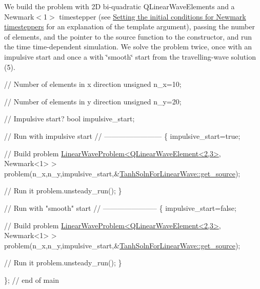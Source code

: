 We build the problem with 2D bi-\/quadratic {\ttfamily Q\+Linear\+Wave\+Elements} and a {\ttfamily Newmark$<$1$>$} timestepper (see \hyperlink{index_IC}{Setting the initial conditions for Newmark timesteppers} for an explanation of the template argument), passing the number of elements, and the pointer to the source function to the constructor, and run the time time-\/dependent simulation. We solve the problem twice, once with an impulsive start and once a with \char`\"{}smooth\char`\"{} start from the travelling-\/wave solution (5).


\begin{DoxyCodeInclude}
 
 \textcolor{comment}{// Number of elements in x direction}
 \textcolor{keywordtype}{unsigned} n\_x=10;

 \textcolor{comment}{// Number of elements in y direction}
 \textcolor{keywordtype}{unsigned} n\_y=20;

 \textcolor{comment}{// Impulsive start?}
 \textcolor{keywordtype}{bool} impulsive\_start;

 \textcolor{comment}{// Run with impulsive start}
 \textcolor{comment}{// ------------------------}
 \{
  impulsive\_start=\textcolor{keyword}{true};

  \textcolor{comment}{// Build problem}
  \hyperlink{classLinearWaveProblem}{LinearWaveProblem<QLinearWaveElement<2,3>}, Newmark<1> >
   problem(n\_x,n\_y,impulsive\_start,&\hyperlink{namespaceTanhSolnForLinearWave_a3bc9643b40e62283dc09f405ed17c805}{TanhSolnForLinearWave::get\_source});
  
  \textcolor{comment}{// Run it}
  problem.unsteady\_run();
 \}

 \textcolor{comment}{// Run with "smooth" start}
 \textcolor{comment}{// -----------------------}
 \{
  impulsive\_start=\textcolor{keyword}{false};

  \textcolor{comment}{// Build problem}
  \hyperlink{classLinearWaveProblem}{LinearWaveProblem<QLinearWaveElement<2,3>}, Newmark<1> >
   problem(n\_x,n\_y,impulsive\_start,&\hyperlink{namespaceTanhSolnForLinearWave_a3bc9643b40e62283dc09f405ed17c805}{TanhSolnForLinearWave::get\_source});
  
  \textcolor{comment}{// Run it}
  problem.unsteady\_run();
 \}


\}; \textcolor{comment}{// end of main}

\end{DoxyCodeInclude}




